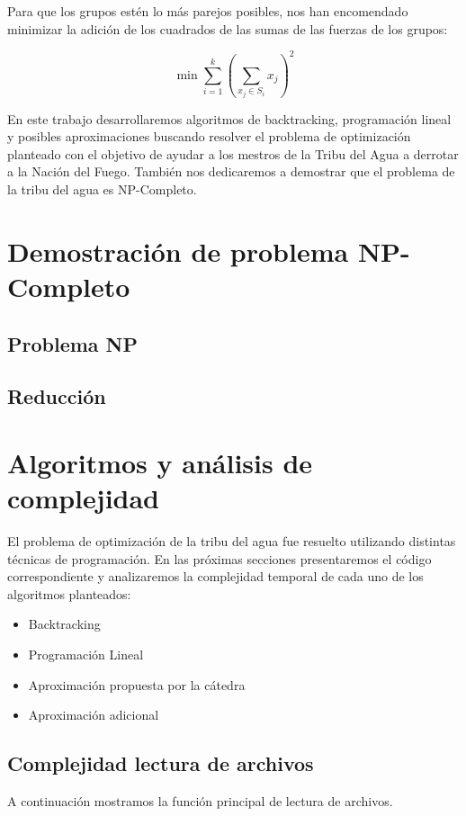 \documentclass{article}
\begin{document}
Para que los grupos estén lo más parejos posibles, nos han encomendado minimizar la adición de los cuadrados de las sumas de las fuerzas de los grupos:

$$
\min \sum_{i=1}^{k} \left( \sum_{x_j \in S_i} x_j \right)^2
$$

En este trabajo desarrollaremos algoritmos de backtracking, programación lineal y posibles aproximaciones buscando resolver el problema de optimización planteado con el objetivo de ayudar a los mestros de la Tribu del Agua a derrotar a la Nación del Fuego. También nos dedicaremos a demostrar que el problema de la tribu del agua es NP-Completo.

\section{Demostración de problema NP-Completo}
\subsection{Problema NP}
\subsection{Reducción}

\section{Algoritmos y análisis de complejidad}

El problema de optimización de la tribu del agua fue resuelto utilizando distintas técnicas de programación. En las próximas secciones presentaremos el código correspondiente y analizaremos la complejidad temporal de cada uno de los algoritmos planteados:
\begin{itemize}
    \item Backtracking
    \item Programación Lineal
    \item Aproximación propuesta por la cátedra
    \item Aproximación adicional
\end{itemize}

\subsection{Complejidad lectura de archivos}
A continuación mostramos la función principal de lectura de archivos. 
\inputminted[linenos, firstline=9, lastline=24]{python}{codigo/archivos.py}
\end{document}
